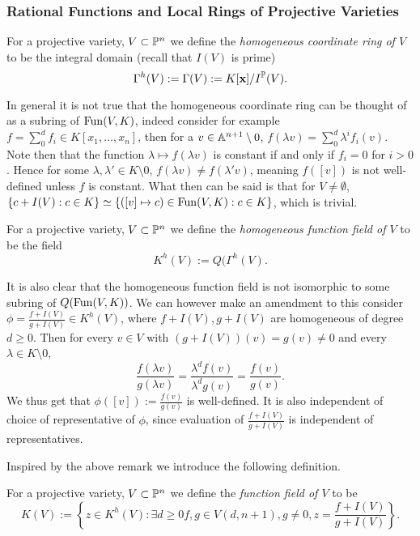    \subsubsection{Rational Functions and Local Rings of Projective Varieties}
    \begin{definition}
        For a projective variety, $V\subset \mathbb{P}^n$ we define the \textit{homogeneous coordinate ring of $V$} to be the integral domain (recall that $I(V)$ is prime)
        $$\Gamma^h(V):= \Gamma(V):= K[\mathbf{x}]/I^{\mathbb{P}}(V).$$
    \end{definition}
    \begin{remark}
        In general it is not true that the homogeneous coordinate ring can be thought of as a subring of $\mathrm{Fun}(V,K)$, indeed consider for example $f=\sum_0^d f_i\in K[x_1,\dots,x_n]$, then for a $v\in \mathbb{A}^{n+1}\setminus 0$, $f(\lambda v) = \sum_0^d \lambda^if_i(v)$. Note then that the function $\lambda \mapsto f(\lambda v)$ is constant if and only if $f_i=0$ for $i>0$. Hence for some $\lambda,\lambda'\in K\setminus 0$, $f(\lambda v)\neq f(\lambda'v)$, meaning $f([v])$ is not well-defined unless $f$ is constant. What then can be said is that for $V\neq \emptyset$, $\{c + I(V) : c\in K\} \simeq \{ ([v]\mapsto c)\in \mathrm{Fun}(V,K): c \in K\}$, which is trivial. 
    \end{remark}
    \begin{definition}
        For a projective variety, $V\subset \mathbb{P}^n$ we define the \textit{homogeneous function field of $V$} to be the field 
        $$K^h(V):= Q(\Gamma^h(V).$$
    \end{definition}
    \begin{remark}
        It is also clear that the homogeneous function field is not isomorphic to some subring of $Q(\mathrm{Fun}(V,K))$. We can however make an amendment to this consider $\phi=\frac{f+ I(V)}{g+I(V)}\in K^h(V)$, where $f+I(V),g+I(V)$ are homogeneous of degree $d\geq 0$. Then for every $v\in V$ with $(g+I(V))(v)=g(v)\neq 0$ and every $\lambda\in K\setminus 0$,
        $$\frac{f(\lambda v)}{g(\lambda v)} = \frac{\lambda^d f(v)}{\lambda^d g(v)}=\frac{f(v)}{g(v)}.$$
        We thus get that $\phi([v]):= \frac{f(v)}{g(v)}$ is well-defined. It is also independent of choice of representative of $\phi$, since evaluation of $\frac{f+I(V)}{g+I(V)}$ is independent of representatives. 
    \end{remark}
    Inspired by the above remark we introduce the following definition. 
    \begin{definition}
        For a projective variety, $V\subset \mathbb{P}^n$ we define the \textit{function field of $V$} to be 
        $$K(V) := \left\{ z\in K^h(V) : \exists d\geq 0 f,g\in V(d,n+1), g\neq 0, z=\frac{f+I(V)}{g+I(V)}\right\}.$$
    \end{definition}
